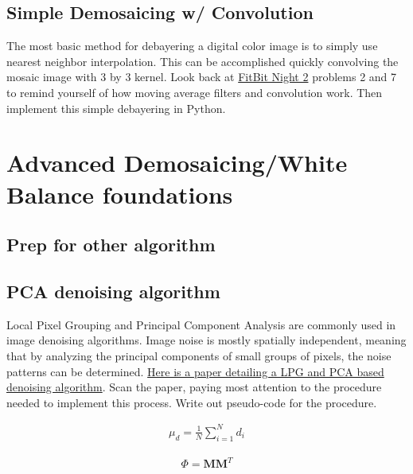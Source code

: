 \documentclass{tufte-handout}
\begin{document}


\subsection{Simple Demosaicing w/ Convolution}
The most basic method for debayering a digital color image is to simply use nearest neighbor interpolation. This can be accomplished quickly convolving the mosaic image with 3 by 3 kernel. Look back at \href{https://drive.google.com/file/d/1_eEtwNDHhF-Izfcf6l00PvG-b6whwety/view}{FitBit Night 2} problems 2 and 7 to remind yourself of how moving average filters and convolution work. Then implement this simple debayering in Python.


\section{Advanced Demosaicing/White Balance foundations}

\subsection{Prep for other algorithm}  %

\subsection{PCA denoising algorithm}  %
Local Pixel Grouping and Principal Component Analysis are commonly used in image denoising algorithms. Image noise is mostly spatially independent, meaning that by analyzing the principal components of small groups of pixels, the noise patterns can be determined.
\href{https://www4.comp.polyu.edu.hk/~cslzhang/paper/PR_10_x_3.pdf}{Here is a paper detailing a LPG and PCA based denoising algorithm}. Scan the paper, paying most attention to the procedure needed to implement this process. Write out pseudo-code for the procedure. %

\begin{align}
 \mu_{d} = \frac{1}{N} \sum_{i=1}^{N} d_{i} \label{eqn:Mean}
\end{align}

\begin{align}
\Phi = \mathbf{MM}^{T} \label{eqn:Covariance}
\end{align}
\end{document}
